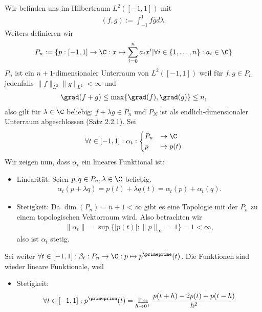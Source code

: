 \begin{solution}
Wir befinden uns im Hilbertraum $L^2([-1,1])$ mit
\begin{align*}
  (f,g) := \int_{-1}^1 f\overline{g} d\lambda.
\end{align*}
Weiters definieren wir
\begin{align*}
  P_n:= \{p: [-1,1] \to \C: x \mapsto \sum_{i=0}^n a_ix^i | \forall i \in
  \{1,\dots,n\}: a_i \in \C\}
\end{align*}
$P_n$ ist ein $n+1$-dimensionaler Unterraum von $L^2([-1,1])$ weil für $f,g \in P_n$
jedenfalls $\|f\|_{L^2}\|g\|_{L^2} < \infty$ und
\begin{align*}
  \grad(f+g) \leq \max\{\grad(f), \grad(g)\} \leq n,
\end{align*}
also gilt für $\lambda \in \C$ beliebig: $f + \lambda g \in P_n$
und $P_N$ ist als endlich-dimensionaler Unterraum abgeschlossen (Satz 2.2.1).
Sei
\begin{align*}
  \forall t \in [-1,1]: \alpha_t: \begin{cases}
    P_n &\to \C \\
    p &\mapsto p(t)
  \end{cases}
\end{align*}
Wir zeigen nun, dass $\alpha_t$ ein lineares Funktional ist:
\begin{itemize}
  \item Linearität: Seien $p,q \in P_n, \lambda \in \C$ beliebig.
  \begin{align*}
    \alpha_t(p + \lambda q) = p(t) + \lambda q(t) = \alpha_t(p) + \alpha_t(q).
  \end{align*}
  \item Stetigkeit: Da $\dim(P_n) = n + 1 < \infty$ gibt es eine Topologie mit
  der $P_n$ zu einem topologischen Vektorraum wird. Also betrachten wir
  \begin{align*}
    \|\alpha_t\| = \sup\{|p(t)|: \|p\|_{\infty} = 1\} = 1 < \infty,
  \end{align*}
  also ist $\alpha_t$ stetig.
\end{itemize}
Sei weiter $\forall t \in [-1,1]: \beta_t : P_n \to \C: p \mapsto p^{\primeprime}(t)$.
Die Funktionen sind wieder lineare Funktionale, weil
\begin{itemize}
  \item Stetigkeit:
  \begin{align*}
    \forall t \in [-1,1]: p^{\primeprime}(t) = \lim_{h \to 0^+}\frac{p(t+h) - 2p(t) + p(t-h)}{h^2}
  \end{align*}

\end{itemize}
\end{solution}
